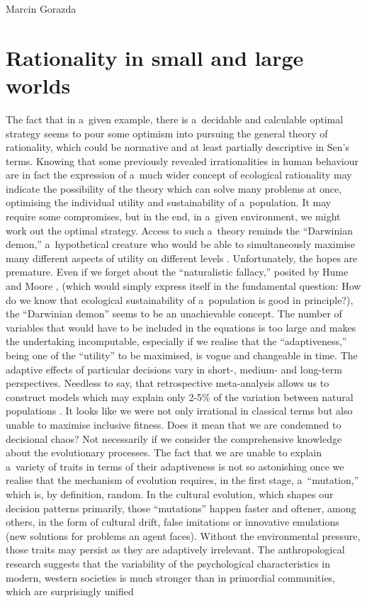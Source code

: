 \begin{artengenv}{Marcin Gorazda}
\section*{Rationality in small and large worlds}
The fact that in a~given example, there is a~decidable and calculable optimal strategy seems to pour some optimism into pursuing the general theory of rationality, which could be normative and at least partially descriptive in Sen's terms. Knowing that some previously revealed irrationalities in human behaviour are in fact the expression of a~much wider concept of ecological rationality may indicate the possibility of the theory which can solve many problems at once, optimising the individual utility and sustainability of a~population. It may require some compromises, but in the end, in a~given environment, we might work out the optimal strategy. Access to such a~theory reminds the ``Darwinian demon,'' a~hypothetical creature who would be able to simultaneously maximise many different aspects of utility on different levels
\parencite[][]{law_optimal_1979}. %
 Unfortunately, the hopes are premature. Even if we forget about the ``naturalistic fallacy,'' posited by Hume 
\parencite*[][]{hume_treatise_2000} %
 and Moore 
\parencite*[][]{moore_principia_2004}, %
 (which would simply express itself in the fundamental question: How do we know that ecological sustainability of a~population is good in principle?), the ``Darwinian demon'' seems to be an unachievable concept. The number of variables that would have to be included in the equations is too large and makes the undertaking incomputable, especially if we realise that the ``adaptiveness,'' being one of the ``utility'' to be maximised, is vogue and changeable in time. The adaptive effects of particular decisions vary in short-, medium- and long-term perspectives. Needless to say, that retrospective meta-analysis allows us to construct models which may explain only 2-5\% of the variation between natural populations 
\parencite[][]{mouden_what_2012}. %
 It looks like we were not only irrational in classical terms but also unable to maximise inclusive fitness. Does it mean that we are condemned to decisional chaos? Not necessarily if we consider the comprehensive knowledge about the evolutionary processes. The fact that we are unable to explain a~variety of traits in terms of their adaptiveness is not so astonishing once we realise that the mechanism of evolution requires, in the first stage, a~``mutation,'' which is, by definition, random. In the cultural evolution, which shapes our decision patterns primarily, those ``mutations'' happen faster and oftener, among others, in the form of cultural drift, false imitations or innovative emulations (new solutions for problems an agent faces). Without the environmental pressure, those traits may persist as they are adaptively irrelevant. The anthropological research suggests that the variability of the psychological characteristics in modern, western societies is much stronger than in primordial communities, which are surprisingly unified 

\end{artengenv}
